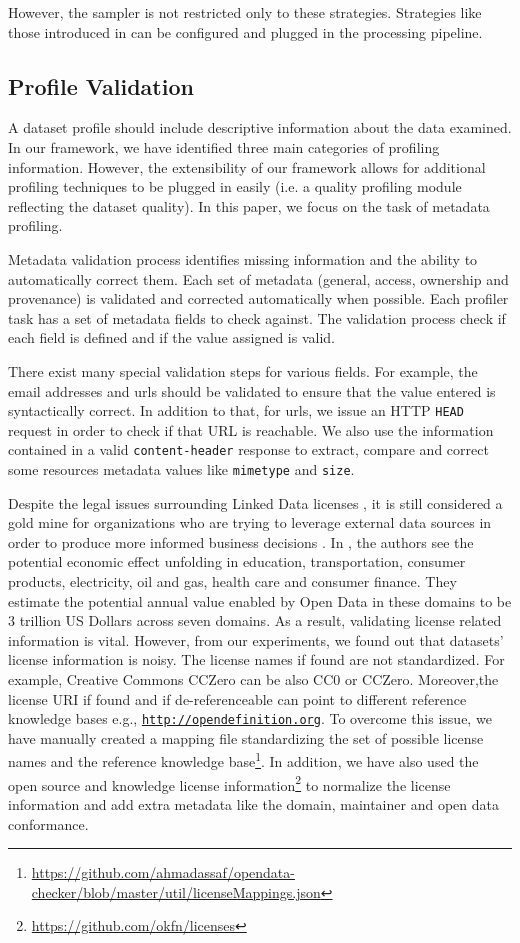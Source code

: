 \documentclass[runningheads,a4paper]{llncs}
\begin{document}
However, the sampler is not restricted only to these strategies. Strategies like those introduced in \cite{Leskovec:2006:SLG:1150402.1150479} can be configured and plugged in the processing pipeline.

\subsection{Profile Validation}
A dataset profile should include descriptive information about the data examined. In our framework, we have identified three main categories of profiling information. However, the extensibility of our framework allows for additional profiling techniques to be plugged in easily (i.e. a quality profiling module reflecting the dataset quality). In this paper, we focus on the task of metadata profiling.

Metadata validation process identifies missing information and the ability to automatically correct them. Each set of metadata (general, access, ownership and provenance) is validated and corrected automatically when possible. Each profiler task has a set of metadata fields to check against. The validation process check if each field is defined and if the value assigned is valid.

There exist many special validation steps for various fields. For example, the email addresses and urls should be validated to ensure that the value entered is syntactically correct. In addition to that, for urls, we issue an HTTP \texttt{HEAD} request in order to check if that URL is reachable. We also use the information contained in a valid \texttt{content-header} response to extract, compare and correct some resources metadata values like \texttt{mimetype} and \texttt{size}.

Despite the legal issues surrounding Linked Data licenses \cite{nomoneyLOD}, it is still considered a gold mine for organizations who are trying to leverage external data sources in order to produce more informed business decisions \cite{Boyd2011}. In \cite{mckinseyreport}, the authors see the potential economic effect unfolding in education, transportation, consumer products, electricity, oil and gas, health care and consumer finance. They estimate the potential annual value enabled by Open Data in these domains to be 3 trillion US Dollars across seven domains. As a result, validating license related information is vital. However, from our experiments, we found out that datasets' license information is noisy. The license names if found are not standardized. For example, Creative Commons CCZero can be also CC0 or CCZero. Moreover,the license URI if found and if de-referenceable can point to different reference knowledge bases e.g., \texttt{\url{http://opendefinition.org}}. To overcome this issue, we have manually created a mapping file standardizing the set of possible license names and the reference knowledge base\footnote{\url{https://github.com/ahmadassaf/opendata-checker/blob/master/util/licenseMappings.json}}. In addition, we have also used the open source and knowledge license information\footnote{\url{https://github.com/okfn/licenses}} to normalize the license information and add extra metadata like the domain, maintainer and open data conformance.
\end{document}
